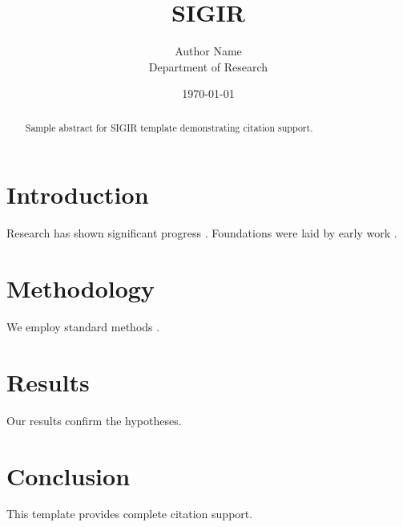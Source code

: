 \documentclass{article}
\title{SIGIR}
\author{Author Name \\ \small Department of Research}
\date{\today}
\begin{document}
\maketitle

\begin{abstract}
Sample abstract for SIGIR template demonstrating citation support.
\end{abstract}

\section{Introduction}
Research has shown significant progress \citep{einstein1905}. Foundations were laid by early work \citep{turing1950}.

\section{Methodology}
We employ standard methods \citep{knuth1984}.

\section{Results}
Our results confirm the hypotheses.

\section{Conclusion}
This template provides complete citation support.



\end{document}
